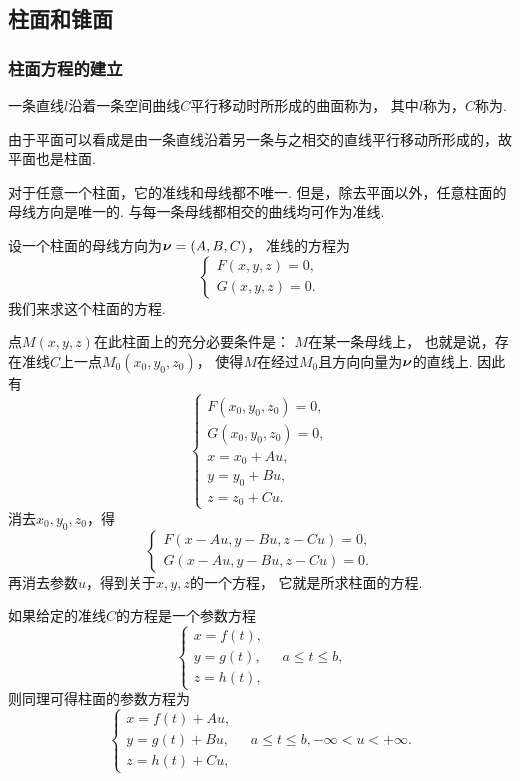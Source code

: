 \subsection{柱面和锥面}
\subsubsection{柱面方程的建立}
一条直线\(l\)沿着一条空间曲线\(C\)平行移动时所形成的曲面称为，
其中\(l\)称为，\(C\)称为.

由于平面可以看成是由一条直线沿着另一条与之相交的直线平行移动所形成的，故平面也是柱面.

对于任意一个柱面，它的准线和母线都不唯一.
但是，除去平面以外，任意柱面的母线方向是唯一的.
与每一条母线都相交的曲线均可作为准线.

设一个柱面的母线方向为\(\boldsymbol{\nu}=(A,B,C)\)，
准线的方程为\[
	\left\{ \begin{array}{l}
		F(x,y,z) = 0, \\
		G(x,y,z) = 0.
	\end{array} \right.
\]
我们来求这个柱面的方程.

点\(M(x,y,z)\)在此柱面上的充分必要条件是：
\(M\)在某一条母线上，
也就是说，存在准线\(C\)上一点\(M_0(x_0,y_0,z_0)\)，
使得\(M\)在经过\(M_0\)且方向向量为\(\boldsymbol{\nu}\)的直线上.
因此有\[
	\left\{ \begin{array}{l}
		F(x_0,y_0,z_0) = 0, \\
		G(x_0,y_0,z_0) = 0, \\
		x = x_0 + Au, \\
		y = y_0 + Bu, \\
		z = z_0 + Cu.
	\end{array} \right.
\]
消去\(x_0,y_0,z_0\)，得\[
	\left\{ \begin{array}{l}
		F(x - Au,y - Bu,z - Cu) = 0, \\
		G(x - Au,y - Bu,z - Cu) = 0.
	\end{array} \right.
\]
再消去参数\(u\)，得到关于\(x,y,z\)的一个方程，
它就是所求柱面的方程.

如果给定的准线\(C\)的方程是一个参数方程\[
	\left\{ \begin{array}{l}
		x = f(t), \\
		y = g(t), \\
		z = h(t),
	\end{array} \right.
	\quad a \leq t \leq b,
\]
则同理可得柱面的参数方程为\[
	\left\{ \begin{array}{l}
		x = f(t) + Au, \\
		y = g(t) + Bu, \\
		z = h(t) + Cu,
	\end{array} \right.
	\quad
	a \leq t \leq b,
	-\infty < u < +\infty.
\]

